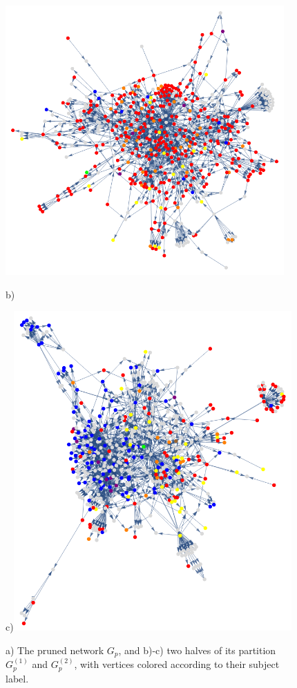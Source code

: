 \documentclass[12pt]{thesis}
\theoremstyle{plain}
\theoremstyle{definition}
\theoremstyle{remark}
\begin{document}
\begin{figure}[p]
\begin{minipage}[c]{0.7\textwidth}
\end{minipage}
\begin{minipage}[c]{0.49\textwidth}
\includegraphics[width=0.95\textwidth]{color_coded_left.png}

b)
\vspace{-16pt}
\end{minipage}
\hfill
\begin{minipage}[c]{0.49\textwidth}
c)\includegraphics[width=0.95\textwidth]{color_coded_right.png}
\end{minipage}
\caption{a) The pruned network $G_p$, and b)-c) two halves of its partition $G_p^{(1)}$ and $G_p^{(2)}$, with vertices colored according to their subject label.}
\label{fig:subject_color_coded}
\end{figure}
\end{document}
